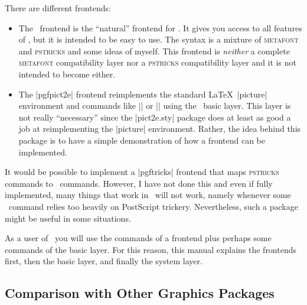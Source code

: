 \begin{description}
  There are different frontends:
  \begin{itemize}
  \item
    The \tikzname\ frontend is the ``natural'' frontend for \pgfname. It gives
    you access to all features of \pgfname, but it is intended to be
    easy to use. The syntax is a mixture of \textsc{metafont} and
    \textsc{pstricks} and some ideas of myself. This frontend is            %
    \emph{neither} a complete \textsc{metafont} compatibility layer nor
    a \textsc{pstricks} compatibility layer and it is not intended to
    become either.
  \item
    The |pgfpict2e| frontend reimplements the standard \LaTeX\
    |{picture}|  environment and commands like |\line| or |\vector|
    using the \pgfname\ basic layer. This layer is not really ``necessary''
    since the |pict2e.sty| package does at least as good a job at
    reimplementing the |{picture}| environment. Rather, the idea
    behind this package is to have a simple demonstration of how a
    frontend can be implemented.
  \end{itemize}

  It would be possible to implement a |pgftricks| frontend that maps
  \textsc{pstricks} commands to \pgfname\ commands. However, I have not
  done this and even if fully implemented, many things that work in
  \pstricks\ will not work, namely whenever some \pstricks\ command
  relies too heavily on PostScript trickery. Nevertheless, such a
  package might be useful in some situations.
\end{description}

As a user of \pgfname\ you will use the commands of a
frontend plus perhaps some commands of the basic layer. For this
reason, this manual explains the frontends first, then the basic
layer, and finally the system layer.



\subsection{Comparison with Other Graphics Packages}

